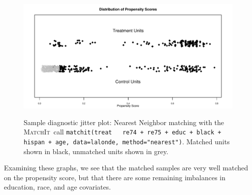 \documentclass[oneside,letterpaper,titlepage]{article}
\newcommand{\MatchIt}{\textsc{MatchIt}}
\begin{document}
\begin{enumerate}
\begin{figure}[tbp]
  \begin{center}
    {\includegraphics[scale=0.5]{figs/jitterplotnn}}
    \hfill
    \caption{Sample diagnostic jitter plot: Nearest Neighbor matching
      with the \MatchIt\ call \texttt{matchit(treat ~ re74 + re75 +
        educ + black + hispan + age, data=lalonde, method="nearest")}.
      Matched units shown in black, unmatched units shown in grey.}
\label{diagjitternn}
\end{center}
\end{figure}
Examining these graphs, we see that the matched samples are very well
matched on the propensity score, but that there are some remaining
imbalances in education, race, and age covariates. 

\end{enumerate}

%
%
\end{document}
